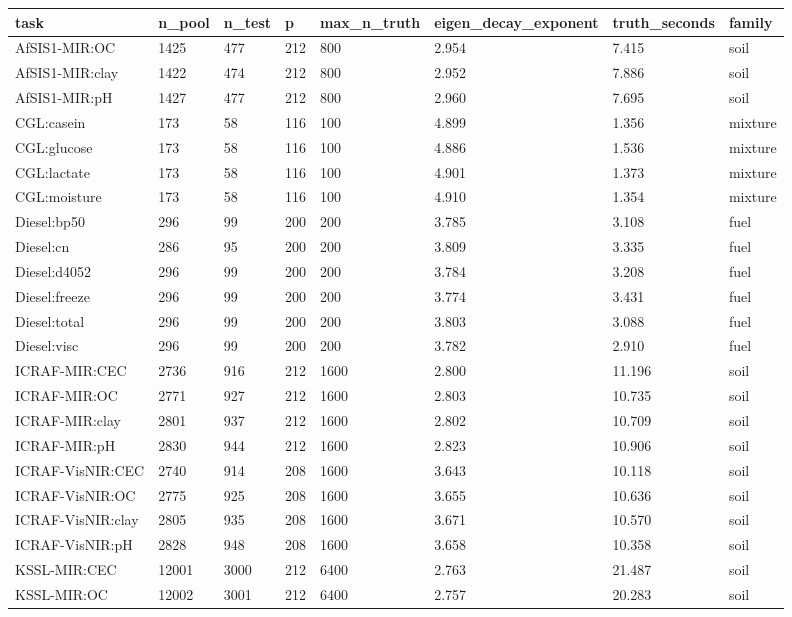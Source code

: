 \begin{tabular}{llllllll}
\hline
task & n\_pool & n\_test & p & max\_n\_truth & eigen\_decay\_exponent & truth\_seconds & family \\
\hline
AfSIS1-MIR:OC & 1425 & 477 & 212 & 800 & 2.954 & 7.415 & soil \\
AfSIS1-MIR:clay & 1422 & 474 & 212 & 800 & 2.952 & 7.886 & soil \\
AfSIS1-MIR:pH & 1427 & 477 & 212 & 800 & 2.960 & 7.695 & soil \\
CGL:casein & 173 & 58 & 116 & 100 & 4.899 & 1.356 & mixture \\
CGL:glucose & 173 & 58 & 116 & 100 & 4.886 & 1.536 & mixture \\
CGL:lactate & 173 & 58 & 116 & 100 & 4.901 & 1.373 & mixture \\
CGL:moisture & 173 & 58 & 116 & 100 & 4.910 & 1.354 & mixture \\
Diesel:bp50 & 296 & 99 & 200 & 200 & 3.785 & 3.108 & fuel \\
Diesel:cn & 286 & 95 & 200 & 200 & 3.809 & 3.335 & fuel \\
Diesel:d4052 & 296 & 99 & 200 & 200 & 3.784 & 3.208 & fuel \\
Diesel:freeze & 296 & 99 & 200 & 200 & 3.774 & 3.431 & fuel \\
Diesel:total & 296 & 99 & 200 & 200 & 3.803 & 3.088 & fuel \\
Diesel:visc & 296 & 99 & 200 & 200 & 3.782 & 2.910 & fuel \\
ICRAF-MIR:CEC & 2736 & 916 & 212 & 1600 & 2.800 & 11.196 & soil \\
ICRAF-MIR:OC & 2771 & 927 & 212 & 1600 & 2.803 & 10.735 & soil \\
ICRAF-MIR:clay & 2801 & 937 & 212 & 1600 & 2.802 & 10.709 & soil \\
ICRAF-MIR:pH & 2830 & 944 & 212 & 1600 & 2.823 & 10.906 & soil \\
ICRAF-VisNIR:CEC & 2740 & 914 & 208 & 1600 & 3.643 & 10.118 & soil \\
ICRAF-VisNIR:OC & 2775 & 925 & 208 & 1600 & 3.655 & 10.636 & soil \\
ICRAF-VisNIR:clay & 2805 & 935 & 208 & 1600 & 3.671 & 10.570 & soil \\
ICRAF-VisNIR:pH & 2828 & 948 & 208 & 1600 & 3.658 & 10.358 & soil \\
KSSL-MIR:CEC & 12001 & 3000 & 212 & 6400 & 2.763 & 21.487 & soil \\
KSSL-MIR:OC & 12002 & 3001 & 212 & 6400 & 2.757 & 20.283 & soil \\

\end{tabular}

